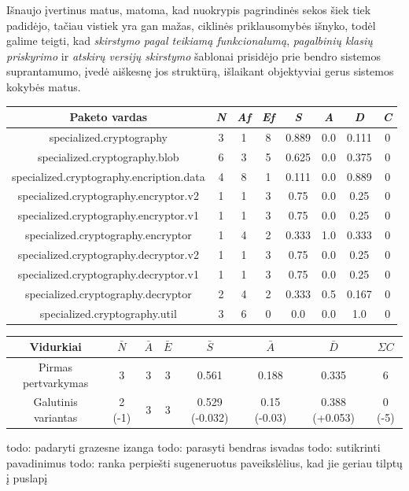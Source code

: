 Išnaujo įvertinus matus, matoma, kad nuokrypis pagrindinės sekos šiek tiek padidėjo, tačiau
vistiek yra gan mažas, ciklinės priklausomybės išnyko, todėl galime teigti, kad \textit{skirstymo pagal teikiamą funkcionalumą},
\textit{pagalbinių klasių priskyrimo} ir \textit{atskirų versijų skirstymo} šablonai prisidėjo prie bendro
sistemos suprantamumo, įvedė aiškesnę jos struktūrą, išlaikant objektyviai gerus sistemos kokybės matus.
\begin{center}
    \begin{tabular}{|c|c|c|c|c|c|c|c|}
        \hline
        Paketo vardas & \textit{N} & \textit{Af} & \textit{Ef} & \textit{S} & \textit{A} & \textit{D} & \textit{C} \\ [0.5ex]
        \hline\hline
        specialized.cryptography & 3 & 1 & 8 & 0.889 & 0.0 & 0.111 & 0 \\
        \hline
        specialized.cryptography.blob & 6 & 3 & 5 & 0.625 & 0.0 & 0.375 & 0 \\
        \hline
        specialized.cryptography.encription.data & 4 & 8 & 1 & 0.111 & 0.0 & 0.889 & 0 \\
        \hline
        specialized.cryptography.encryptor.v2 & 1 & 1 & 3 & 0.75 & 0.0 & 0.25 & 0 \\
        \hline
        specialized.cryptography.encryptor.v1 & 1 & 1 & 3 & 0.75 & 0.0 & 0.25 & 0 \\
        \hline
        specialized.cryptography.encryptor & 1 & 4 & 2 & 0.333 & 1.0 & 0.333 & 0 \\
        \hline
        specialized.cryptography.decryptor.v2 & 1 & 1 & 3 & 0.75 & 0.0 & 0.25 & 0 \\
        \hline
        specialized.cryptography.decryptor.v1 & 1 & 1 & 3 & 0.75 & 0.0 & 0.25 & 0 \\
        \hline
        specialized.cryptography.decryptor & 2 & 4 & 2 & 0.333 & 0.5 & 0.167 & 0 \\
        \hline
        specialized.cryptography.util & 3 & 6 & 0 & 0.0 & 0.0 & 1.0 & 0 \\
        \hline
    \end{tabular}
    \begin{tabular}{|c|c|c|c|c|c|c|c|}
        \hline
        Vidurkiai & $\bar{N}$ & $\bar{A}$ & $\bar{E}$ & $\bar{S}$ & $\bar{A}$ & $\bar{D}$ & $\Sigma C$ \\ [0.5ex]
        \hline\hline
        Pirmas pertvarkymas & 3 & 3 & 3 & 0.561 & 0.188 & 0.335 &  6 \\
        Galutinis variantas & \cellcolor{green!25} 2 (-1) & 3 & 3 & \cellcolor{green!25} 0.529 (-0.032) & \cellcolor{red!25} 0.15 (-0.03) & \cellcolor{red!25} 0.388 (+0.053) &  \cellcolor{green!25} 0 (-5) \\
        \hline
    \end{tabular}
\end{center}

todo: padaryti grazesne izanga
todo: parasyti bendras isvadas
todo: sutikrinti pavadinimus
todo: ranka perpiešti sugeneruotus paveikslėlius, kad jie geriau tilptų į puslapį

